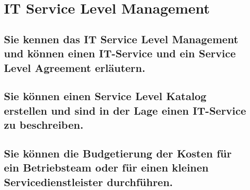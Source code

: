 \section{IT Service Level Management}

\subsection{Sie kennen das IT Service Level Management und können einen IT-Service und ein Service Level Agreement erläutern.}

\subsection{Sie können einen Service Level Katalog erstellen und sind in der Lage einen IT-Service zu beschreiben.}

\subsection{Sie können die Budgetierung der Kosten für ein Betriebsteam oder für einen kleinen Servicedienstleister durchführen.}